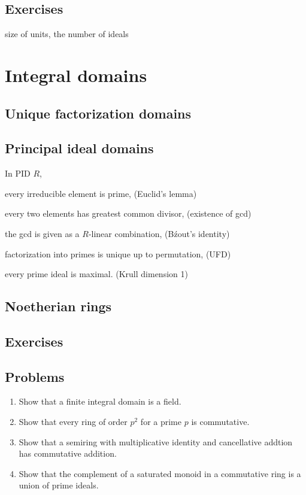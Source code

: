 \documentclass{../../large}
\begin{document}
\section*{Exercises}
size of units, the number of ideals








\chapter{Integral domains}
\section{Unique factorization domains}
\section{Principal ideal domains}

\begin{prb}
In PID $R$,
\begin{parts}
\item every irreducible element is prime, \hfill(Euclid's lemma)
\item every two elements has greatest common divisor, \hfill(existence of gcd)
\item the gcd is given as a $R$-linear combination, \hfill(B\'zout's identity)
\item factorization into primes is unique up to permutation, \hfill(UFD)
\item every prime ideal is maximal. \hfill(Krull dimension 1)
\end{parts}
\end{prb}


\section{Noetherian rings}

\section*{Exercises}
\section*{Problems}
\begin{enumerate}
\item Show that a finite integral domain is a field.
\item Show that every ring of order $p^2$ for a prime $p$ is commutative.
\item Show that a semiring with multiplicative identity and cancellative addtion has commutative addition.
\item Show that the complement of a saturated monoid in a commutative ring is a union of prime ideals.
\end{enumerate}
\end{document}
